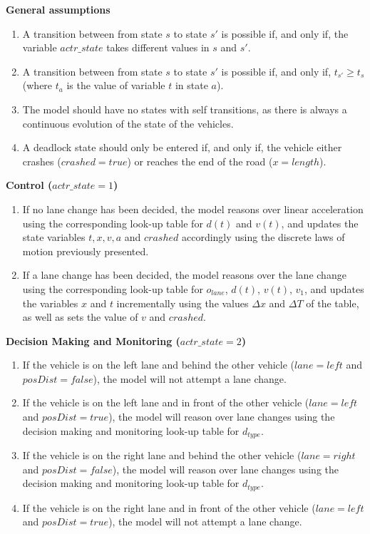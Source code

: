 \textbf{General assumptions}

\begin{enumerate}
	\item A transition between from state $s$ to state $s'$ is possible if, and only if, the variable $actr\_state$ takes different values in $s$ and $s'$.
	\item A transition between from state $s$ to state $s'$ is possible if, and only if, $t_{s'} \geq t_s$ (where $t_a$ is the value of variable $t$ in state $a$).
	\item The model should have no states with self transitions, as there is always a continuous evolution of the state of the vehicles.
	\item A deadlock state should only be entered if, and only if, the vehicle either crashes ($crashed = true$) or reaches the end of the road ($x = length$).
\end{enumerate}

\textbf{Control ($actr\_state = 1$)}

\begin{enumerate}
	\item If no lane change has been decided, the model reasons over linear acceleration using the corresponding look-up table for $d(t)$ and $v(t)$, and updates the state variables $t, x, v, a$ and $crashed$ accordingly using the discrete laws of motion previously presented.
	\item If a lane change has been decided, the model reasons over the lane change using the corresponding look-up table for $o_{lane}$, $d(t)$, $v(t)$, $v_1$, and updates the variables $x$ and $t$ incrementally using the values $\Delta x$ and $\Delta T$ of the table, as well as sets the value of $v$ and $crashed$.
\end{enumerate}

\textbf{Decision Making and Monitoring ($actr\_state = 2$)}

\begin{enumerate}
	\item If the vehicle is on the left lane and behind the other vehicle ($lane=left$ and $posDist = false$), the model will not attempt a lane change.
	\item If the vehicle is on the left lane and in front of the other vehicle ($lane=left$ and $posDist = true$), the model will reason over lane changes using the decision making and monitoring look-up table for $d_{type}$.
	\item If the vehicle is on the right lane and behind the other vehicle ($lane=right$ and $posDist = false$), the model will reason over lane changes using the decision making and monitoring look-up table for $d_{type}$.
	\item If the vehicle is on the right lane and in front of the other vehicle ($lane=left$ and $posDist = true$), the model will not attempt a lane change.
\end{enumerate}

